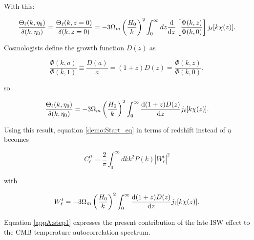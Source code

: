 \documentclass[openany,a4paper,12pt,oneside]{book}
\begin{document}
\begin{spacing}{1.5}
With this:

\begin{equation}
	\frac{\Theta_\ell(k,\eta_0)}{\delta(k,\eta_0)}=\frac{\Theta_\ell(k,z=0)}{\delta(k,z=0)}=-3\Omega_m\left(\frac{H_0}{k}\right)^2\int_0^\infty dz \dv{}{z}\left[\frac{\Phi(k,z)}{\Phi(k,0)}\right]j_\ell[k\chi(z)].
\end{equation}

Cosmologists define the growth function $D(z)$ as

\begin{equation}
	\frac{\Phi(k,a)}{\Phi(k,1)}\equiv\frac{D(a)}{a}=(1+z)D(z)=\frac{\Phi(k,z)}{\Phi(k,0)},
\end{equation}

so

\begin{equation}
	\frac{\Theta_\ell(k,\eta_0)}{\delta(k,\eta_0)}=-3\Omega_m\left(\frac{H_0}{k}\right)^2\int_0^\infty \dv{(1+z)D(z)}{z}j_\ell[k\chi(z)].
\end{equation}

Using this result, equation \eqref{demo:Start_eq} in terms of redshift instead of $\eta$ becomes

\begin{equation}\label{AppA:eq_final}
	C_\ell^{tt}=\frac{2}{\pi}\int_0^\infty dk k^2P(k)|W_\ell^t|^2
\end{equation}

\noindent with 

\begin{equation}
	W_\ell^t=-3\Omega_m\left(\frac{H_0}{k}\right)^2\int_0^\infty \dv{(1+z)D(z)}{z}j_\ell[k\chi(z)].
\end{equation}

Equation \eqref{appA:step1} expresses the present contribution of the late ISW  effect to the CMB temperature autocorrelation spectrum.

\end{spacing}
\endgroup

\printbibliography
\end{document}
